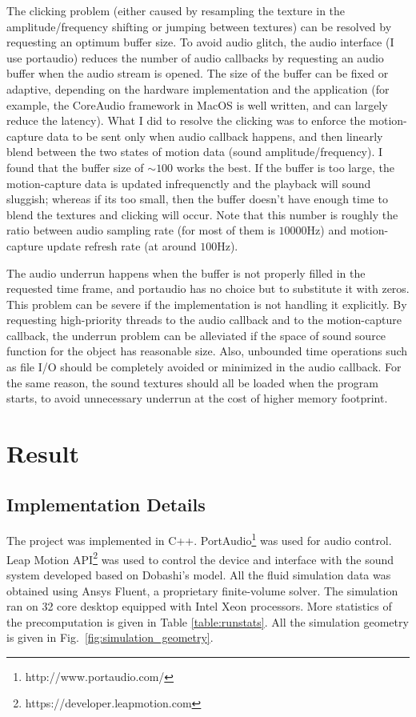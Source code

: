 \documentclass[tog]{acmsiggraph}
\begin{document}
The clicking problem (either caused by resampling the texture in the amplitude/frequency shifting or jumping between textures) can be resolved by requesting an optimum buffer size. To avoid audio glitch, the audio interface (I use portaudio) reduces the number of audio callbacks by requesting an audio buffer when the audio stream is opened. The size of the buffer can be fixed or adaptive, depending on the hardware implementation and the application (for example, the CoreAudio framework in MacOS is well written, and can largely reduce the latency). What I did to resolve the clicking was to enforce the motion-capture data to be sent only when audio callback happens, and then linearly blend between the two states of motion data (sound amplitude/frequency). I found that the buffer size of $\sim100$ works the best. If the buffer is too large, the motion-capture data is updated infrequenctly and the playback will sound sluggish; whereas if its too small, then the buffer doesn't have enough time to blend the textures and clicking will occur. Note that this number is roughly the ratio between audio sampling rate (for most of them is $10000$Hz) and motion-capture update refresh rate (at around $100$Hz).

The audio underrun happens when the buffer is not properly filled in the requested time frame, and portaudio has no choice but to substitute it with zeros. This problem can be severe if the implementation is not handling it explicitly. By requesting high-priority threads to the audio callback and to the motion-capture callback, the underrun problem can be alleviated if the space of sound source function for the object has reasonable size. Also, unbounded time operations such as file I/O should be completely avoided or minimized in the audio callback. For the same reason, the sound textures should all be loaded when the program starts, to avoid unnecessary underrun at the cost of higher memory footprint.


\section{Result} 

\subsection{Implementation Details} 

The project was implemented in C++. PortAudio\footnote{http://www.portaudio.com/} was used for audio control. Leap Motion API\footnote{https://developer.leapmotion.com} was used to control the device and interface with the sound system developed based on Dobashi's model. All the fluid simulation data was obtained using Ansys Fluent, a proprietary finite-volume solver. The simulation ran on 32 core desktop equipped with Intel Xeon processors. More statistics of the precomputation is given in Table \ref{table:runstats}. All the simulation geometry is given in Fig.~\ref{fig:simulation_geometry}. 
\end{document}
